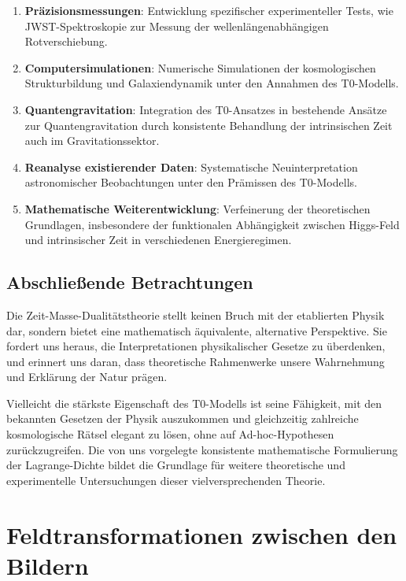 \documentclass{article}
\theoremstyle{definition}
\theoremstyle{remark}
\begin{document}
\begin{enumerate}
	\item \textbf{Präzisionsmessungen}: Entwicklung spezifischer experimenteller Tests, wie JWST-Spektroskopie zur Messung der wellenlängenabhängigen Rotverschiebung.
	
	\item \textbf{Computersimulationen}: Numerische Simulationen der kosmologischen Strukturbildung und Galaxiendynamik unter den Annahmen des T0-Modells.
	
	\item \textbf{Quantengravitation}: Integration des T0-Ansatzes in bestehende Ansätze zur Quantengravitation durch konsistente Behandlung der intrinsischen Zeit auch im Gravitationssektor.
	
	\item \textbf{Reanalyse existierender Daten}: Systematische Neuinterpretation astronomischer Beobachtungen unter den Prämissen des T0-Modells.
	
	\item \textbf{Mathematische Weiterentwicklung}: Verfeinerung der theoretischen Grundlagen, insbesondere der funktionalen Abhängigkeit zwischen Higgs-Feld und intrinsischer Zeit in verschiedenen Energieregimen.
\end{enumerate}

\subsection{Abschließende Betrachtungen}

Die Zeit-Masse-Dualitätstheorie stellt keinen Bruch mit der etablierten Physik dar, sondern bietet eine mathematisch äquivalente, alternative Perspektive. Sie fordert uns heraus, die Interpretationen physikalischer Gesetze zu überdenken, und erinnert uns daran, dass theoretische Rahmenwerke unsere Wahrnehmung und Erklärung der Natur prägen.

Vielleicht die stärkste Eigenschaft des T0-Modells ist seine Fähigkeit, mit den bekannten Gesetzen der Physik auszukommen und gleichzeitig zahlreiche kosmologische Rätsel elegant zu lösen, ohne auf Ad-hoc-Hypothesen zurückzugreifen. Die von uns vorgelegte konsistente mathematische Formulierung der Lagrange-Dichte bildet die Grundlage für weitere theoretische und experimentelle Untersuchungen dieser vielversprechenden Theorie.
\appendix

\section{Feldtransformationen zwischen den Bildern}
\end{document}
